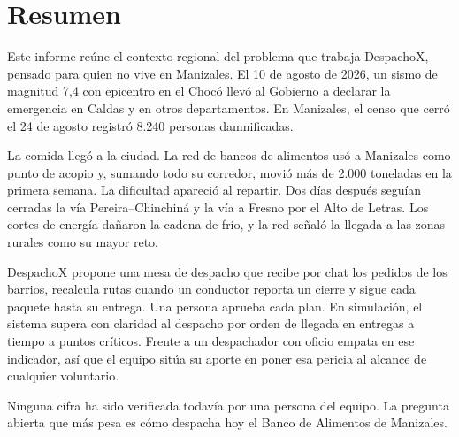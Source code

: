 \section*{Resumen}

Este informe reúne el contexto regional del problema que trabaja DespachoX, pensado para quien no vive en Manizales. El 10 de agosto de 2026, un sismo de magnitud 7,4 con epicentro en el Chocó llevó al Gobierno a declarar la emergencia en Caldas y en otros departamentos. En Manizales, el censo que cerró el 24 de agosto registró 8.240 personas damnificadas.

La comida llegó a la ciudad. La red de bancos de alimentos usó a Manizales como punto de acopio y, sumando todo su corredor, movió más de 2.000 toneladas en la primera semana. La dificultad apareció al repartir. Dos días después seguían cerradas la vía Pereira–Chinchiná y la vía a Fresno por el Alto de Letras. Los cortes de energía dañaron la cadena de frío, y la red señaló la llegada a las zonas rurales como su mayor reto.

DespachoX propone una mesa de despacho que recibe por chat los pedidos de los barrios, recalcula rutas cuando un conductor reporta un cierre y sigue cada paquete hasta su entrega. Una persona aprueba cada plan. En simulación, el sistema supera con claridad al despacho por orden de llegada en entregas a tiempo a puntos críticos. Frente a un despachador con oficio empata en ese indicador, así que el equipo sitúa su aporte en poner esa pericia al alcance de cualquier voluntario.

Ninguna cifra ha sido verificada todavía por una persona del equipo. La pregunta abierta que más pesa es cómo despacha hoy el Banco de Alimentos de Manizales.

\vspace{1.2em}
{\small\tableofcontents}
\clearpage
